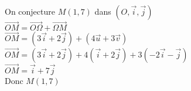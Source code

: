 On conjecture $M\left(1,7\right)$ dans $\left(O, \vec{i}, \vec{j}\right) $\\

$\overrightarrow{OM} = \overrightarrow{O \Omega} + \overrightarrow{\Omega M} $\\

$ \overrightarrow{OM} = \left(3\vec{i} + 2\vec{j}\right) + \left(4\overrightarrow{u} + 3\overrightarrow{v}\right) $\\

$ \overrightarrow{OM} = \left(3\vec{i} + 2\vec{j} \right) + 4\left(\vec{i} + 2\vec{j} \right) + 3\left(-2\vec{i} - \vec{j} \right) $\\

$ \overrightarrow{OM} = \vec{i} + 7\vec{j} $\\

Donc $M\left(1,7\right)$\\

\newpage


\ifdefined\COMPLETE
\else
    
\fi